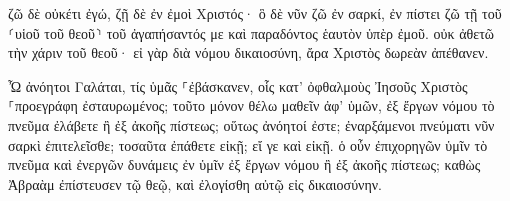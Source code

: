 \documentclass{openreader}
\begin{document}
ζῶ δὲ οὐκέτι ἐγώ, ζῇ δὲ ἐν ἐμοὶ Χριστός· ὃ δὲ νῦν ζῶ ἐν σαρκί, ἐν πίστει ζῶ τῇ τοῦ ⸂υἱοῦ τοῦ θεοῦ⸃ τοῦ ἀγαπήσαντός με καὶ παραδόντος ἑαυτὸν ὑπὲρ ἐμοῦ. 
οὐκ ἀθετῶ τὴν χάριν τοῦ θεοῦ· εἰ γὰρ διὰ νόμου δικαιοσύνη, ἄρα Χριστὸς δωρεὰν ἀπέθανεν. 

Ὦ ἀνόητοι Γαλάται, τίς ὑμᾶς ⸀ἐβάσκανεν, οἷς κατ’ ὀφθαλμοὺς Ἰησοῦς Χριστὸς ⸀προεγράφη ἐσταυρωμένος; 
τοῦτο μόνον θέλω μαθεῖν ἀφ’ ὑμῶν, ἐξ ἔργων νόμου τὸ πνεῦμα ἐλάβετε ἢ ἐξ ἀκοῆς πίστεως; 
οὕτως ἀνόητοί ἐστε; ἐναρξάμενοι πνεύματι νῦν σαρκὶ ἐπιτελεῖσθε; 
τοσαῦτα ἐπάθετε εἰκῇ; εἴ γε καὶ εἰκῇ. 
ὁ οὖν ἐπιχορηγῶν ὑμῖν τὸ πνεῦμα καὶ ἐνεργῶν δυνάμεις ἐν ὑμῖν ἐξ ἔργων νόμου ἢ ἐξ ἀκοῆς πίστεως; 
καθὼς Ἀβραὰμ ἐπίστευσεν τῷ θεῷ, καὶ ἐλογίσθη αὐτῷ εἰς δικαιοσύνην. 
\end{document}
